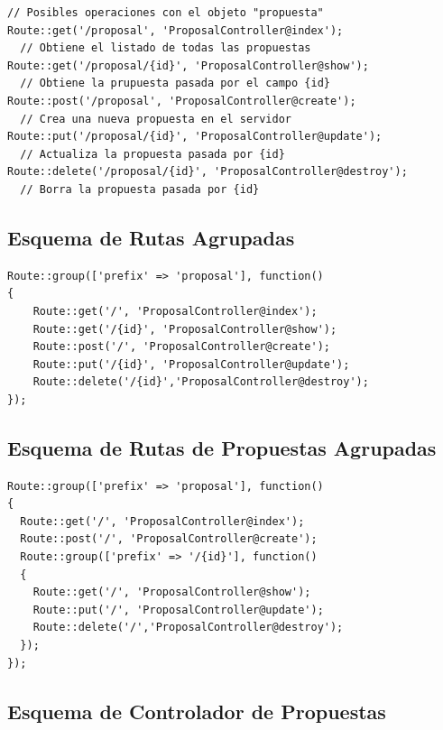 \lstset{
  language        = php}
\begin{lstlisting}[frame=single]
// Posibles operaciones con el objeto "propuesta"
Route::get('/proposal', 'ProposalController@index');
  // Obtiene el listado de todas las propuestas
Route::get('/proposal/{id}', 'ProposalController@show');
  // Obtiene la prupuesta pasada por el campo {id}
Route::post('/proposal', 'ProposalController@create');
  // Crea una nueva propuesta en el servidor
Route::put('/proposal/{id}', 'ProposalController@update');
  // Actualiza la propuesta pasada por {id}
Route::delete('/proposal/{id}', 'ProposalController@destroy');
  // Borra la propuesta pasada por {id}
\end{lstlisting}

\subsection{Esquema de Rutas Agrupadas}\label{ssec:codeRoutesGroupe}

\lstset{
  language        = php}
\begin{lstlisting}[frame=single]
Route::group(['prefix' => 'proposal'], function()
{
    Route::get('/', 'ProposalController@index');
    Route::get('/{id}', 'ProposalController@show');
    Route::post('/', 'ProposalController@create');
    Route::put('/{id}', 'ProposalController@update');
    Route::delete('/{id}','ProposalController@destroy');
});
\end{lstlisting}

\subsection{Esquema de Rutas de Propuestas Agrupadas}\label{ssec:codeRoutesGroupeProposals}

\lstset{
  language        = php}
\begin{lstlisting}[frame=single]
Route::group(['prefix' => 'proposal'], function()
{
  Route::get('/', 'ProposalController@index');
  Route::post('/', 'ProposalController@create');
  Route::group(['prefix' => '/{id}'], function()
  {
    Route::get('/', 'ProposalController@show');
    Route::put('/', 'ProposalController@update');
    Route::delete('/','ProposalController@destroy');
  });
});
\end{lstlisting}

\subsection{Esquema de Controlador de Propuestas}\label{ssec:codeControllerProposals}

